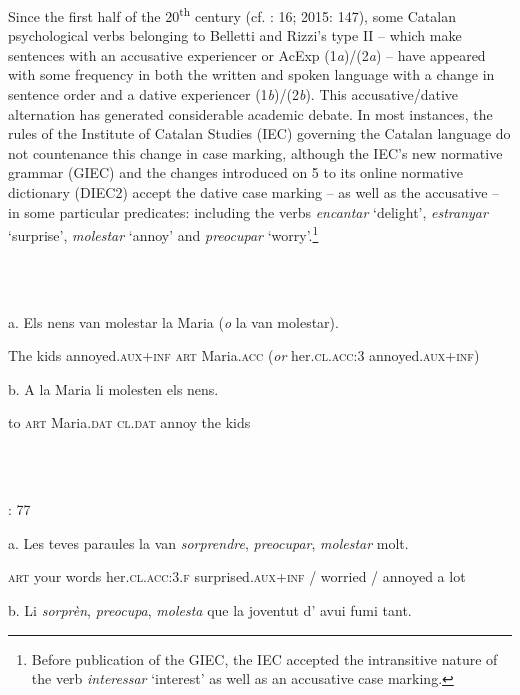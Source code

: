 \documentclass[output=paper,modfonts,nonflat]{langsci/langscibook}
\begin{document}
Since the first half of the 20\textsuperscript{th} century (cf. \citealt{Ginebra2003}: 16; 2015: 147), some Catalan psychological verbs belonging to Belletti and Rizzi’s type II  – which make sentences with an accusative experiencer or AcExp (1\textit{a})/(2\textit{a}) – have appeared with some frequency in both the written and spoken language with a change in sentence order and a dative experiencer (1\textit{b})/(2\textit{b}). This accusative/dative alternation has generated considerable academic debate. In most instances, the rules of the Institute of Catalan Studies (IEC) governing the Catalan language do not countenance this change in case marking, although the IEC’s new normative grammar (GIEC) and the changes introduced on 5 \citealt{April2017} to its online normative dictionary (DIEC2) accept the dative case marking – as well as the accusative – in some particular predicates: including the verbs \textit{encantar} ‘delight’, \textit{estranyar} ‘surprise’, \textit{molestar} ‘annoy’ and \textit{preocupar} ‘worry’.\footnote{Before publication of the GIEC, the IEC accepted the intransitive nature of the verb \textit{interessar} ‘interest’ as well as an accusative case marking.}

\ea%
    \label{ex:key:1}
    \gll\\
        \\
    \glt
    \z

         a. Els nens van molestar        la    Maria         (\textit{o}  la                   van molestar).

       The kids annoyed.\textsc{aux+inf} \textsc{art} Maria.\textsc{acc} (\textit{or} her.\textsc{cl.acc}:3 annoyed.\textsc{aux+inf})

      b. A  la    Maria         li          molesten els nens.

          to \textsc{art} Maria.\textsc{dat} \textsc{cl.dat} annoy      the kids

\ea%
    \label{ex:key:2}
    \gll\\
        \\
    \glt
    \z

         \citealt{CabréMateu1998}: 77

  a. Les teves paraules la                     van \textit{sorprendre},        \textit{preocupar}, \textit{molestar} molt.

     \textsc{art} your  words    her.\textsc{cl.acc:3.f} surprised.\textsc{aux+inf} / worried   /  annoyed  a lot

  b. Li            \textit{sorprèn},    \textit{preocupa}, \textit{molesta} que la   joventut d’ avui   fumi    tant.
\end{document}
